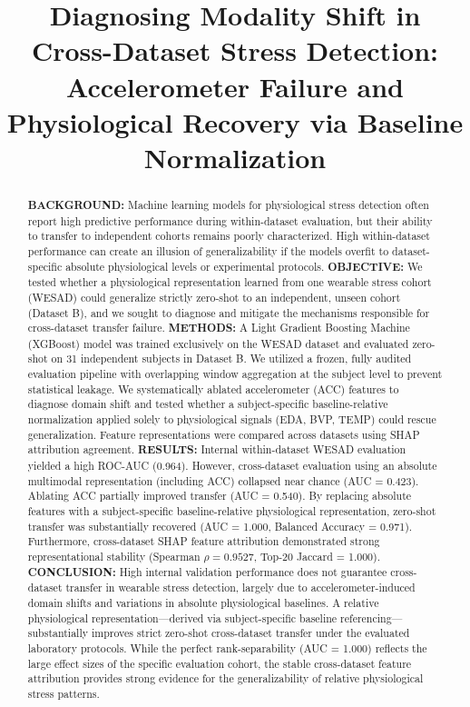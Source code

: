 \documentclass[journal]{IEEEtran}
\begin{document}
\title{Diagnosing Modality Shift in Cross-Dataset Stress Detection: Accelerometer Failure and Physiological Recovery via Baseline Normalization}

\author{
}

\maketitle

\begin{abstract}
\textbf{BACKGROUND:} Machine learning models for physiological stress detection often report high predictive performance during within-dataset evaluation, but their ability to transfer to independent cohorts remains poorly characterized. High within-dataset performance can create an illusion of generalizability if the models overfit to dataset-specific absolute physiological levels or experimental protocols.
\textbf{OBJECTIVE:} We tested whether a physiological representation learned from one wearable stress cohort (WESAD) could generalize strictly zero-shot to an independent, unseen cohort (Dataset B), and we sought to diagnose and mitigate the mechanisms responsible for cross-dataset transfer failure.
\textbf{METHODS:} A Light Gradient Boosting Machine (XGBoost) model was trained exclusively on the WESAD dataset and evaluated zero-shot on 31 independent subjects in Dataset B. We utilized a frozen, fully audited evaluation pipeline with overlapping window aggregation at the subject level to prevent statistical leakage. We systematically ablated accelerometer (ACC) features to diagnose domain shift and tested whether a subject-specific baseline-relative normalization applied solely to physiological signals (EDA, BVP, TEMP) could rescue generalization. Feature representations were compared across datasets using SHAP attribution agreement.
\textbf{RESULTS:} Internal within-dataset WESAD evaluation yielded a high ROC-AUC (0.964). However, cross-dataset evaluation using an absolute multimodal representation (including ACC) collapsed near chance (AUC = 0.423). Ablating ACC partially improved transfer (AUC = 0.540). By replacing absolute features with a subject-specific baseline-relative physiological representation, zero-shot transfer was substantially recovered (AUC = 1.000, Balanced Accuracy = 0.971). Furthermore, cross-dataset SHAP feature attribution demonstrated strong representational stability (Spearman $\rho = 0.9527$, Top-20 Jaccard = 1.000).
\textbf{CONCLUSION:} High internal validation performance does not guarantee cross-dataset transfer in wearable stress detection, largely due to accelerometer-induced domain shifts and variations in absolute physiological baselines. A relative physiological representation—derived via subject-specific baseline referencing—substantially improves strict zero-shot cross-dataset transfer under the evaluated laboratory protocols. While the perfect rank-separability (AUC = 1.000) reflects the large effect sizes of the specific evaluation cohort, the stable cross-dataset feature attribution provides strong evidence for the generalizability of relative physiological stress patterns.
\end{abstract}
\end{document}
